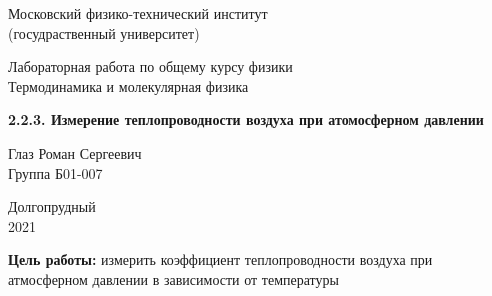 \documentclass[a4paper, 12pt]{article} %
\begin{document}


\begin{titlepage}

    \newpage
    \begin{center}
        \normalsize Московский физико-технический институт \\(госудраственный университет)
    \end{center}

    \vspace{6em}

    \begin{center}
        \Large Лабораторная работа по общему курсу физики\\Термодинамика и молекулярная физика
    \end{center}

    \vspace{1em}

    \begin{center}
        \Large \textbf{2.2.3. Измерение теплопроводности воздуха при атомосферном давлении}
    \end{center}

    \vspace{2em}

    \begin{center}
        \large Глаз Роман Сергеевич\\
        Группа Б01-007
    \end{center}

    \vspace{\fill}

    \begin{center}
    Долгопрудный \\2021
    \end{center}
    
\end{titlepage}



    \thispagestyle{empty}
    \newpage
    \tableofcontents
    \newpage
    \setcounter{page}{1}



\textbf{Цель работы:} измерить коэффициент теплопроводности воздуха при атмосферном давлении в зависимости от температуры\\
\end{document}
